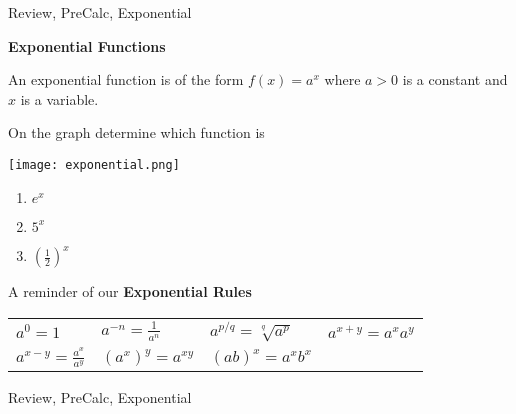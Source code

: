 \begin{tagblock}{Review, PreCalc, Exponential}
\begin{question}

\textbf{Exponential Functions}

An exponential function is of the form $f(x) = a^x$ where $a>0$ is a constant and $x$ is a variable. 


On the graph determine which function is 

\begin{minipage}{.4\textwidth}
\texttt{[image: exponential.png]}\end{minipage}%
\begin{minipage}{.6\textwidth}
\begin{enumerate}
\item  $e^x$
\item $5^x$ 
\item $(\frac{1}{2})^x$
\end{enumerate}

\end{minipage}

A reminder of our \textbf{Exponential Rules} 



\begin{tcolorbox}

    \begin{tabular}{l l l l }
     $a^0=1$ & $a^{-n} = \frac{1}{a^n}$ & $a^{p/q} = \sqrt[q]{a^p}$ &     $a^{x+y} = a^x a^y$ \\ 
     $a^{x-y} = \frac{a^x}{a^y}$ & $(a^x)^y = a^{xy}$ &     $(ab)^x = a^xb^x$ & \\ 
\end{tabular}
\end{tcolorbox}




	
 

\begin{tags}
	    Review, PreCalc, Exponential
\end{tags}
	
\begin{diary}
	    
\end{diary}
	
\begin{solution}
		
\end{solution}
	
\end{question}

\end{tagblock}

